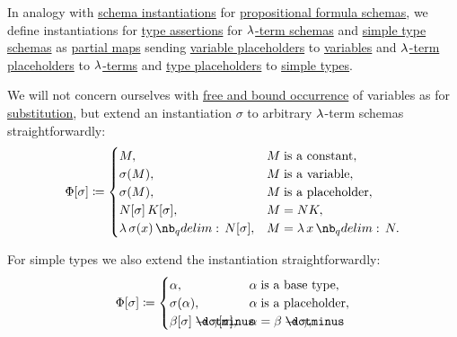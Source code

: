 \begin{definition}\label{def:lambda_schema_instantiation}
  In analogy with \hyperref[def:propositional_schema_instantiation]{schema instantiations} for \hyperref[def:propositional_formula_schema]{propositional formula schemas}, we define instantiations for \hyperref[def:type_assertion]{type assertions} for \hyperref[def:lambda_term_schema]{\( \mathrm{\lambda} \)-term schemas} and \hyperref[def:simple_type_schema]{simple type schemas} as \hyperref[def:set_valued_map/partial]{partial maps} sending \hyperref[def:lambda_term_schema]{variable placeholders} to \hyperref[def:lambda_term]{variables} and \hyperref[def:lambda_term_schema]{\( \mathrm{\lambda} \)-term placeholders} to \hyperref[def:lambda_term]{\( \mathrm{\lambda} \)-terms} and \hyperref[def:simple_type_schema]{type placeholders} to \hyperref[def:simple_type]{simple types}.

  \begin{thmenum}
     We will not concern ourselves with \hyperref[def:lambda_variable_occurrence]{free and bound occurrence} of variables as for \hyperref[def:lambda_term_schema_substitution]{substitution}, but extend an instantiation \( \sigma \) to arbitrary \( \mathrm{\lambda} \)-term schemas straightforwardly:
    \begin{equation}\label{eq:def:lambda_schema_instantiation/terms}
      \Phi[\sigma] \coloneqq \begin{cases}
        M,                               &M \T{is a constant}, \\
        \sigma(M),                       &M \T{is a variable}, \\
        \sigma(M),                       &M \T{is a placeholder}, \\
        N[\sigma] \thinspace K[\sigma],  &M = NK,              \\
        \qabs {\sigma(x)} N[\sigma],     &M = \qabs x N.       \\
      \end{cases}
    \end{equation}

     For simple types we also extend the instantiation straightforwardly:
    \begin{equation}\label{def:lambda_schema_instantiation}
      \Phi[\sigma] \coloneqq \begin{cases}
        \alpha,                                   &\alpha \T{is a base type},   \\
        \sigma(\alpha),                           &\alpha \T{is a placeholder}, \\
        \beta[\sigma] \synimplies \gamma[\sigma], &\alpha = \beta \synimplies \gamma,  \\
      \end{cases}
    \end{equation}


\end{thmenum}
\end{definition}
